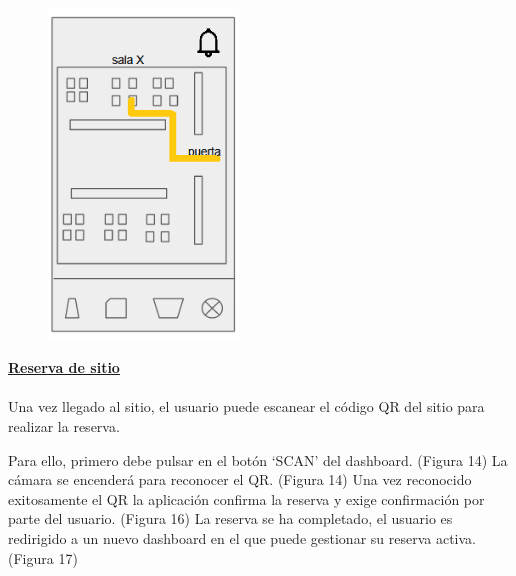 \documentclass[12pt]{article}
\begin{document}
\begin{figure}
	\includegraphics[width=0.45\textwidth]{mapa4.png} 
\endminipage
\end{figure}

\newpage
\textbf{\underline{Reserva de sitio}} \\
\\
Una vez llegado al sitio, el usuario puede escanear el código QR del sitio para realizar la reserva.

Para ello, primero debe pulsar en el botón ‘SCAN’ del dashboard. (Figura 14) La cámara se encenderá para reconocer el QR. (Figura 14) Una vez reconocido exitosamente el QR la aplicación confirma la reserva y exige confirmación por parte del usuario. (Figura 16) La reserva se ha completado, el usuario es redirigido a un nuevo dashboard en el que puede gestionar su reserva activa.(Figura 17)\\
\end{document}
